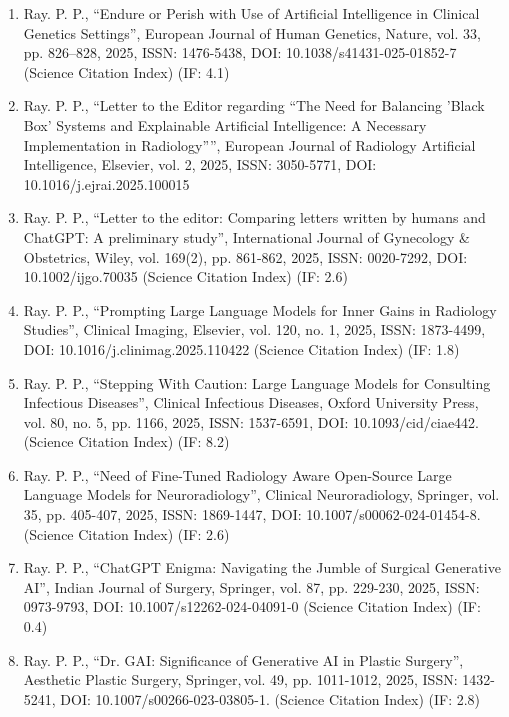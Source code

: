 \documentclass[11pt,a4paper]{moderncv}
\begin{document}
\begin{adjustwidth}{6em}{0pt}
\begin{enumerate}
		\item Ray. P. P., “Endure or Perish with Use of Artificial Intelligence in Clinical Genetics Settings”, European Journal of Human Genetics, Nature, vol. 33, pp. 826–828, 2025, ISSN: 1476-5438, DOI: 10.1038/s41431-025-01852-7 (Science Citation Index) (IF: 4.1)
		
		\item Ray. P. P., “Letter to the Editor regarding “The Need for Balancing 'Black Box' Systems and Explainable Artificial Intelligence: A Necessary Implementation in Radiology””, European Journal of Radiology Artificial Intelligence, Elsevier, vol. 2, 2025, ISSN: 3050-5771, DOI: 10.1016/j.ejrai.2025.100015 
		
		\item Ray. P. P., “Letter to the editor: Comparing letters written by humans and ChatGPT: A preliminary study”, International Journal of Gynecology \& Obstetrics, Wiley, vol. 169(2), pp. 861-862, 2025, ISSN: 0020-7292, DOI: 10.1002/ijgo.70035 (Science Citation Index) (IF: 2.6)
		
		\item Ray. P. P., “Prompting Large Language Models for Inner Gains in Radiology Studies”, Clinical Imaging, Elsevier, vol. 120, no. 1, 2025, ISSN: 1873-4499, DOI: 10.1016/j.clinimag.2025.110422 (Science Citation Index) (IF: 1.8)
		
		\item Ray. P. P., “Stepping With Caution: Large Language Models for Consulting Infectious Diseases”, Clinical Infectious Diseases, Oxford University Press, vol. 80, no. 5, pp. 1166, 2025, ISSN: 1537-6591, DOI: 10.1093/cid/ciae442. (Science Citation Index) (IF: 8.2)
		
		\item Ray. P. P., “Need of Fine-Tuned Radiology Aware Open-Source Large Language Models for Neuroradiology”, Clinical Neuroradiology, Springer, vol. 35, pp. 405-407, 2025, ISSN: 1869-1447, DOI: 10.1007/s00062-024-01454-8. (Science Citation Index) (IF: 2.6)
		
		\item Ray. P. P., “ChatGPT Enigma: Navigating the Jumble of Surgical Generative AI”, Indian Journal of Surgery, Springer, vol. 87, pp. 229-230, 2025, ISSN: 0973-9793, DOI: 10.1007/s12262-024-04091-0 (Science Citation Index) (IF: 0.4)
		
		\item Ray. P. P., “Dr. GAI: Significance of Generative AI in Plastic Surgery”, Aesthetic Plastic Surgery, Springer, vol. 49, pp. 1011-1012, 2025, ISSN: 1432-5241, DOI: 10.1007/s00266-023-03805-1. (Science Citation Index) (IF: 2.8)
		

\end{enumerate}
\end{adjustwidth}
\end{document}

